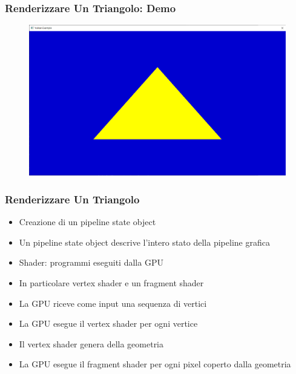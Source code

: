 \begin{frame}
\frametitle{Renderizzare Un Triangolo: Demo}
\begin{figure}[ht]
    \centering
    \includegraphics[scale=0.25]{images/SlidesTriangle/Triangle.png}
\end{figure}
\end{frame}

\begin{frame}
\frametitle{Renderizzare Un Triangolo}
\begin{itemize}
\item Creazione di un pipeline state object
\item Un pipeline state object descrive l'intero stato della pipeline grafica
\item Shader: programmi eseguiti dalla GPU
\item In particolare vertex shader e un fragment shader
\item La GPU riceve come input una sequenza di vertici
\item La GPU esegue il vertex shader per ogni vertice
\item Il vertex shader genera della geometria
\item La GPU esegue il fragment shader per ogni pixel coperto dalla geometria
\end{itemize}
\end{frame}
